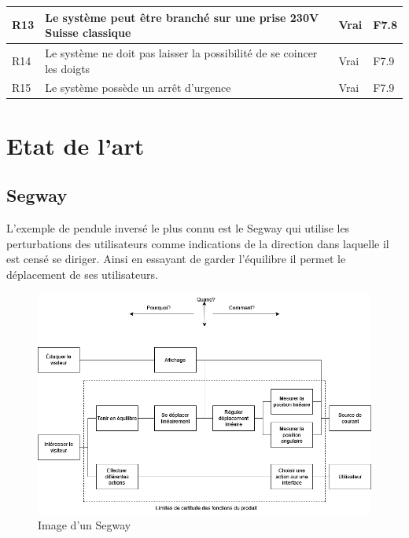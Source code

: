 \begin{table}[H]
{\begin{tabular}{|l|l|l|l|}
            R13                                                                                                                     & Le système peut être branché sur une prise 230V Suisse classique        & Vrai             & F7.8     \\ \hline
            R14                                                                                                                     & Le système ne doit pas laisser la possibilité de se coincer les doigts  & Vrai             & F7.9     \\ \hline
            R15                                                                                                                     & Le système possède un arrêt d'urgence                                   & Vrai             & F7.9     \\ \hline
        \end{tabular}%
    }
\end{table}

\section{Etat de l'art}\label{sec:EtatArt}

\subsection{Segway}

L'exemple de pendule inversé le plus connu est le Segway \cite{Segway} qui utilise les perturbations des utilisateurs comme indications de la direction dans laquelle il est censé se diriger. Ainsi en essayant de garder l'équilibre il permet le déplacement de ses utilisateurs.

\begin{figure}[H]
    \centering
    \includegraphics[width = \textwidth]{assets/figures/AnalyseFAST.png}
    \caption{Image d'un Segway \cite{Segway}}
    \label{fig:Segway}
\end{figure}


